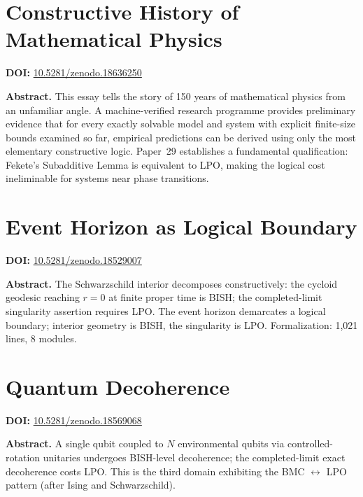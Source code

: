\documentclass[11pt,a4paper]{article}
\begin{document}
\section{Constructive History of Mathematical Physics}
\label{sec:p12}
\textbf{DOI:} \href{https://doi.org/10.5281/zenodo.18636250}{10.5281/zenodo.18636250}

\bigskip
\noindent\textbf{Abstract.}
This essay tells the story of 150 years of mathematical physics from an unfamiliar angle. A machine-verified research programme provides preliminary evidence that for every exactly solvable model and system with explicit finite-size bounds examined so far, empirical predictions can be derived using only the most elementary constructive logic. Paper~29 establishes a fundamental qualification: Fekete's Subadditive Lemma is equivalent to LPO, making the logical cost ineliminable for systems near phase transitions.

\section{Event Horizon as Logical Boundary}
\label{sec:p13}
\textbf{DOI:} \href{https://doi.org/10.5281/zenodo.18529007}{10.5281/zenodo.18529007}

\bigskip
\noindent\textbf{Abstract.}
The Schwarzschild interior decomposes constructively: the cycloid geodesic reaching $r=0$ at finite proper time is BISH; the completed-limit singularity assertion requires LPO. The event horizon demarcates a logical boundary; interior geometry is BISH, the singularity is LPO. Formalization: 1,021 lines, 8 modules.

\section{Quantum Decoherence}
\label{sec:p14}
\textbf{DOI:} \href{https://doi.org/10.5281/zenodo.18569068}{10.5281/zenodo.18569068}

\bigskip
\noindent\textbf{Abstract.}
A single qubit coupled to $N$ environmental qubits via controlled-rotation unitaries undergoes BISH-level decoherence; the completed-limit exact decoherence costs LPO. This is the third domain exhibiting the BMC $\leftrightarrow$ LPO pattern (after Ising and Schwarzschild).
\end{document}
